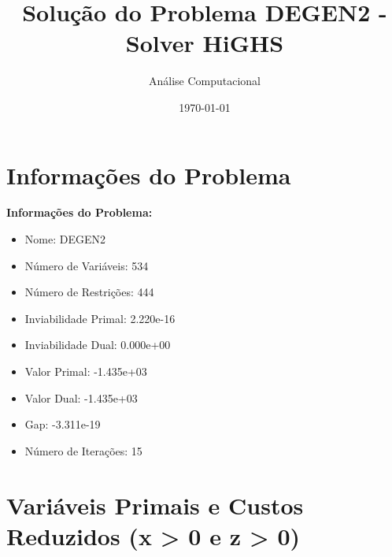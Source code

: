 \documentclass[12pt]{article}
\title{Solução do Problema DEGEN2 - Solver HiGHS}
\author{Análise Computacional}
\date{\today}
\begin{document}
\maketitle

\section{Informações do Problema}

\textbf{Informações do Problema:}
\begin{itemize}
\item Nome: DEGEN2
\item Número de Variáveis: 534
\item Número de Restrições: 444
\item Inviabilidade Primal: 2.220e-16
\item Inviabilidade Dual: 0.000e+00
\item Valor Primal: -1.435e+03
\item Valor Dual: -1.435e+03
\item Gap: -3.311e-19
\item Número de Iterações: 15
\end{itemize}


\section{Variáveis Primais e Custos Reduzidos (x > 0 e z > 0)}
\end{document}
